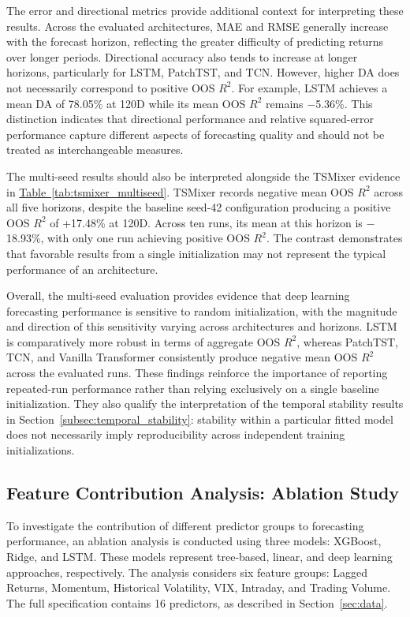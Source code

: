 \documentclass[12pt,twoside]{ord}
\begin{document}
The error and directional metrics provide additional context for interpreting these results. Across the evaluated architectures, MAE and RMSE generally increase with the forecast horizon, reflecting the greater difficulty of predicting returns over longer periods. Directional accuracy also tends to increase at longer horizons, particularly for LSTM, PatchTST, and TCN. However, higher DA does not necessarily correspond to positive OOS $R^2$. For example, LSTM achieves a mean DA of 78.05\% at 120D while its mean OOS $R^2$ remains $-$5.36\%. This distinction indicates that directional performance and relative squared-error performance capture different aspects of forecasting quality and should not be treated as interchangeable measures.

The multi-seed results should also be interpreted alongside the TSMixer evidence in \hyperref[tab:tsmixer_multiseed]{Table~\ref*{tab:tsmixer_multiseed}}. TSMixer records negative mean OOS $R^2$ across all five horizons, despite the baseline seed-42 configuration producing a positive OOS $R^2$ of +17.48\% at 120D. Across ten runs, its mean at this horizon is $-$18.93\%, with only one run achieving positive OOS $R^2$. The contrast demonstrates that favorable results from a single initialization may not represent the typical performance of an architecture.

Overall, the multi-seed evaluation provides evidence that deep learning forecasting performance is sensitive to random initialization, with the magnitude and direction of this sensitivity varying across architectures and horizons. LSTM is comparatively more robust in terms of aggregate OOS $R^2$, whereas PatchTST, TCN, and Vanilla Transformer consistently produce negative mean OOS $R^2$ across the evaluated runs. These findings reinforce the importance of reporting repeated-run performance rather than relying exclusively on a single baseline initialization. They also qualify the interpretation of the temporal stability results in Section~\ref{subsec:temporal_stability}: stability within a particular fitted model does not necessarily imply reproducibility across independent training initializations.

\subsection{Feature Contribution Analysis: Ablation Study}\label{subsec:ablation_study}

To investigate the contribution of different predictor groups to forecasting performance, an ablation analysis is conducted using three models: XGBoost, Ridge, and LSTM. These models represent tree-based, linear, and deep learning approaches, respectively. The analysis considers six feature groups: Lagged Returns, Momentum, Historical Volatility, VIX, Intraday, and Trading Volume. The full specification contains 16 predictors, as described in Section~\ref{sec:data}.
\end{document}
